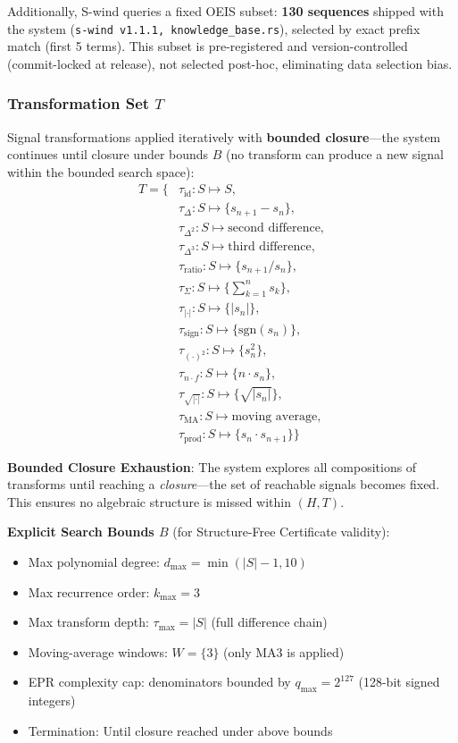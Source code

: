 \documentclass[twocolumn,showpacs,preprintnumbers,amsmath,amssymb,prl]{revtex4-2}
\begin{document}
Additionally, S-wind queries a fixed OEIS subset: \textbf{130 sequences} shipped with the system (\texttt{s-wind v1.1.1, knowledge\_base.rs}), selected by exact prefix match (first 5 terms). This subset is pre-registered and version-controlled (commit-locked at release), not selected post-hoc, eliminating data selection bias.

\subsubsection{Transformation Set $T$}

Signal transformations applied iteratively with \textbf{bounded closure}---the system continues until closure under bounds $B$ (no transform can produce a new signal within the bounded search space):
\begin{align}
    T = \{ &\tau_{\text{id}}: S \mapsto S, \\
           &\tau_{\Delta}: S \mapsto \{s_{n+1} - s_n\}, \\
           &\tau_{\Delta^2}: S \mapsto \text{second difference}, \\
           &\tau_{\Delta^3}: S \mapsto \text{third difference}, \\
           &\tau_{\text{ratio}}: S \mapsto \{s_{n+1}/s_n\}, \\
           &\tau_{\Sigma}: S \mapsto \{\sum_{k=1}^{n} s_k\}, \\
           &\tau_{|\cdot|}: S \mapsto \{|s_n|\}, \\
           &\tau_{\text{sign}}: S \mapsto \{\text{sgn}(s_n)\}, \\
           &\tau_{(\cdot)^2}: S \mapsto \{s_n^2\}, \\
           &\tau_{n \cdot f}: S \mapsto \{n \cdot s_n\}, \\
           &\tau_{\sqrt{|\cdot|}}: S \mapsto \{\sqrt{|s_n|}\}, \\
           &\tau_{\text{MA}}: S \mapsto \text{moving average}, \\
           &\tau_{\text{prod}}: S \mapsto \{s_n \cdot s_{n+1}\} \}
\end{align}

\textbf{Bounded Closure Exhaustion}: The system explores all compositions of transforms until reaching a \textit{closure}---the set of reachable signals becomes fixed. This ensures no algebraic structure is missed within $(H, T)$.

\textbf{Explicit Search Bounds $B$} (for Structure-Free Certificate validity):
\begin{itemize}
    \item Max polynomial degree: $d_{\max} = \min(|S|-1, 10)$
    \item Max recurrence order: $k_{\max} = 3$
    \item Max transform depth: $\tau_{\max} = |S|$ (full difference chain)
    \item Moving-average windows: $W = \{3\}$ (only MA3 is applied)
    \item EPR complexity cap: denominators bounded by $q_{\max} = 2^{127}$ (128-bit signed integers)
    \item Termination: Until closure reached under above bounds
\end{itemize}
\end{document}

